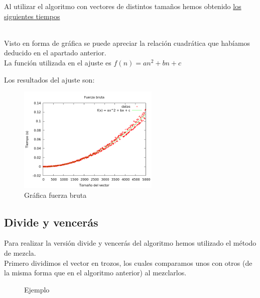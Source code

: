 Al utilizar el algoritmo con vectores de distintos tamaños hemos obtenido \hyperref[tabla_comp]{los siguientes tiempos}\\\

Visto en forma de gráfica se puede apreciar la relación cuadrática que habíamos deducido en el apartado anterior.\\

La función utilizada en el ajuste es $f(n) = an^2 + bn + c$

Los resultados del ajuste son:\\

\begin{center}
\end{center}


\begin{figure}[h]
\centering
	\includegraphics[width=0.6\textwidth]{../Opcional/Graficas/fuerza_bruta_bruno.png}
	\caption{Gráfica fuerza bruta} 
	\label{fig:perros} 
\end{figure}

\newpage

\subsection{Divide y vencerás}
Para realizar la versión divide y vencerás del algoritmo hemos utilizado el método de mezcla.\\

Primero dividimos el vector en trozos, los cuales comparamos unos con otros (de la misma forma que en el algoritmo anterior) al mezclarlos.\\


\begin{figure}[h] 
\centering
	\caption{Ejemplo} 
\end{figure}


